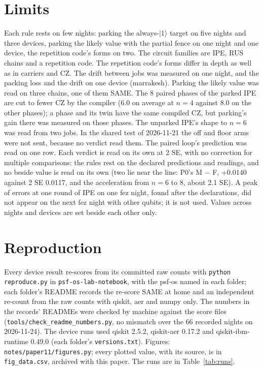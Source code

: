 \documentclass[10pt,a4paper]{article}
\newcommand{\ket}[1]{|#1\rangle}
\begin{document}
\section{Limits}\label{sec:limits}
Each rule rests on few nights: parking the always-$\ket{1}$ target on five nights and three devices, parking the
likely value with the partial fence on one night and one device, the repetition code's forms on two. The circuit
families are IPE, RUS chains and a repetition code. The repetition code's forms differ in depth as well as in carriers
and CZ. The drift between jobs was measured on one night, and the packing loss and the drift on one device
(marrakesh). Parking the likely value was read on three chains, one of them SAME. The 8 paired phases of the parked IPE
are cut to fewer CZ by the compiler (6.0 on average at $n = 4$ against 8.0 on the other phases); a phase and its twin
have the same compiled CZ, but parking's gain there was measured on those phases. The unparked IPE's shape to $n = 6$
was read from two jobs. In the shared test of 2026-11-21 the off and floor arms were not sent, because no verdict read them. The paired
loop's prediction was read on one row. Each verdict is read on its own at 2 SE, with no correction for multiple comparisons: the rules rest on the declared
predictions and readings, and no beside value is read on its own (two lie near the line: P0's M $-$ F, $+0.0140$
against 2 SE 0.0117, and the acceleration from $n = 6$ to 8, about 2.1 SE). A peak of errors at one round of IPE on one fez night,
found after the declarations, did not appear on the next fez night with other qubits; it is not used. Values across
nights and devices are set beside each other only.

\section{Reproduction}\label{sec:repro}
Every device result re-scores from its committed raw counts with \texttt{python reproduce.py} in
\texttt{psf-os-lab-notebook}, with the psf-os named in each folder; each folder's README records the re-score SAME at
home and an independent re-count from the raw counts with qiskit, aer and numpy only. The numbers in the records'
READMEs were checked by machine against the score files (\texttt{tools/check\_readme\_numbers.py}, no mismatch over the 66 recorded nights on 2026-11-24). The device runs used qiskit 2.5.2, qiskit-aer 0.17.2 and qiskit-ibm-runtime 0.49.0 (each folder's
\texttt{versions.txt}). Figures: \texttt{notes/paper11/figures.py}; every plotted value, with its source, is in
\texttt{fig\_data.csv}, archived with this paper. The runs are in Table~\ref{tab:runs}.
\end{document}
